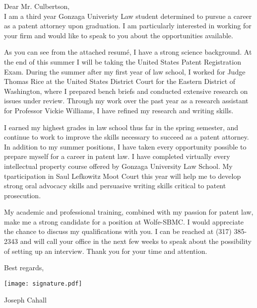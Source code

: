 \documentclass[11pt, letterpaper]{article}
\def\name{Joseph Cahall}
\begin{document}
\begin{large}
Dear Mr. Culbertson,\\

I am a third year Gonzaga Univeristy Law student determined to pursue a career as a patent attorney upon graduation. I am particularly interested in working for your firm and would like to speak to you about the opportunities available.

As you can see from the attached resum\'{e}, I have a strong science background. At the end of this summer I will be taking the United States Patent Registration Exam. During the summer after my first year of law school, I worked for Judge Thomas Rice at the United States District Court for the Eastern District of Washington, where I prepared bench briefs and conducted extensive research on issues under review. Through my work over the past year as a research assistant for Professor Vickie Williams, I have refined my research and writing skills. 

I earned my highest grades in law school thus far in the spring semester, and continue to work to improve the skills necessary to succeed as a patent attorney. In addition to my summer positions, I have taken every opportunity possible to prepare myself for a career in patent law. I have completed virtually every intellectual property course offered by Gonzaga University Law School. My tparticipation in Saul Lefkowitz Moot Court this year will help me to develop strong oral advocacy skills and persuasive writing skills critical to patent prosecution.

My academic and professional training, combined with my passion for patent law, make me a strong candidate for a position at Wolfe-SBMC. I would appreciate the chance to discuss my qualifications with you. I can be reached at (317) 385-2343 and will call your office in the next few weeks to speak about the possibility of setting up an interview. Thank you for your time and attention.


\flushright
Best regards,
\par \medskip

\texttt{[image: signature.pdf]} \par %

\name \par
\end{large}
\end{document}
